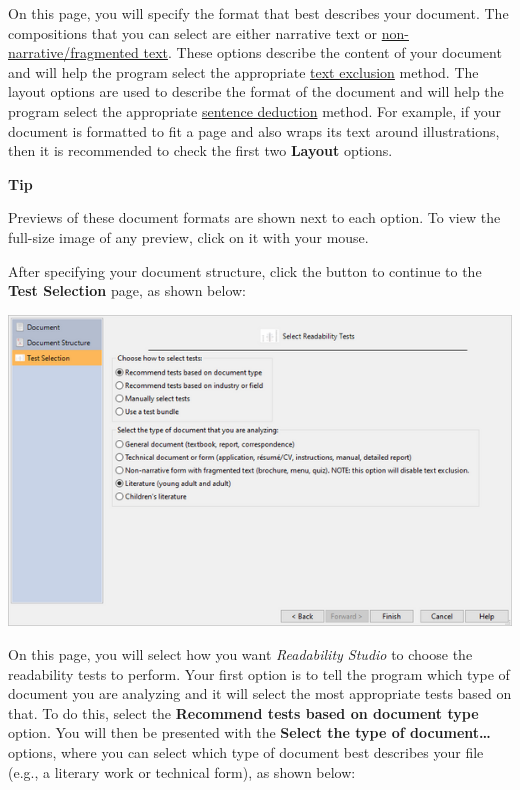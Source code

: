 \documentclass[
]{book}
\newenvironment{tipsection}
    {
    \begin{tcolorbox}[colframe=lightgray,colback=lightyellow,arc=3mm]
    \faLightbulb[regular] \textbf{Tip} \newline
    }
    {
    \end{tcolorbox}
    }
\theoremstyle{definition}
\theoremstyle{definition}
\theoremstyle{definition}
\theoremstyle{definition}
\theoremstyle{remark}
\begin{document}
On this page, you will specify the format that best describes your document. The compositions that you can select are either narrative text or \protect\hyperlink{framented-text}{non-narrative/fragmented text}. These options describe the content of your document and will help the program select the appropriate \protect\hyperlink{options-text-exclusion}{text exclusion} method. The layout options are used to describe the format of the document and will help the program select the appropriate \protect\hyperlink{options-sentence-deduction}{sentence deduction} method. For example, if your document is formatted to fit a page and also wraps its text around illustrations, then it is recommended to check the first two \textbf{Layout} options.

\begin{tipsection}
Previews of these document formats are shown next to each option. To view the full-size image of any preview, click on it with your mouse.

\end{tipsection}

After specifying your document structure, click the  button to continue to the \textbf{Test Selection} page, as shown below:

\includegraphics{Images/wizardreadabilitymethods.png}

On this page, you will select how you want \emph{Readability Studio} to choose the readability tests to perform. Your first option is to tell the program which type of document you are analyzing and it will select the most appropriate tests based on that. To do this, select the \textbf{Recommend tests based on document type} option. You will then be presented with the \textbf{Select the type of document\ldots{}} options, where you can select which type of document best describes your file (e.g., a literary work or technical form), as shown below:
\end{document}
